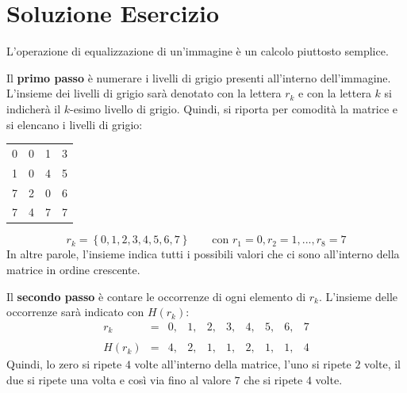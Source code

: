 \documentclass[a4paper]{article}
\begin{document}
	\section{Soluzione Esercizio}
	
	L'operazione di equalizzazione di un'immagine è un calcolo piuttosto semplice.\newline
	
	\noindent
	Il \textbf{primo passo} è numerare i livelli di grigio presenti all'interno dell'immagine. L'insieme dei livelli di grigio sarà denotato con la lettera $r_{k}$ e con la lettera $k$ si indicherà il $k$-esimo livello di grigio. Quindi, si riporta per comodità la matrice e si elencano i livelli di grigio:
	\begin{table}[!htbp]
		\centering
		\begin{tabular}{@{} c | c | c | c @{}}
			\toprule
			0 & 0 & 1 & 3 \\
			1 & 0 & 4 & 5 \\
			7 & 2 & 0 & 6 \\
			7 & 4 & 7 & 7 \\
			\bottomrule
		\end{tabular}
	\end{table}
	\begin{equation*}
		r_{k} = \left\{0, 1, 2, 3, 4, 5, 6, 7\right\} \hspace{2em} \text{con } r_{1} = 0, r_{2} = 1, ..., r_{8} = 7
	\end{equation*}
	In altre parole, l'insieme indica tutti i possibili valori che ci sono all'interno della matrice in ordine crescente.\newline
	
	\noindent
	Il \textbf{secondo passo} è contare le occorrenze di ogni elemento di $r_{k}$. L'insieme delle occorrenze sarà indicato con $H\left(r_{k}\right)$:
	\begin{equation*}
		\begin{array}{rlllllllll}
			r_{k} 				& = & 0,& 1,& 2,& 3,& 4,& 5,& 6,& 7 \\
			\\
			H\left(r_{k}\right) & = & 4,& 2,& 1,& 1,& 2,& 1,& 1,& 4
		\end{array}
	\end{equation*}
	Quindi, lo zero si ripete $4$ volte all'interno della matrice, l'uno si ripete $2$ volte, il due si ripete una volta e così via fino al valore $7$ che si ripete $4$ volte.\newline
	
\end{document}
